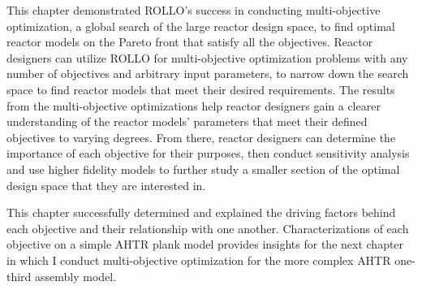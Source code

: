 This chapter demonstrated \gls{ROLLO}'s success in conducting multi-objective 
optimization, a global search of the large reactor design space, to find optimal reactor 
models on the Pareto front that satisfy all the objectives. 
Reactor designers can utilize \gls{ROLLO} for multi-objective optimization problems with 
any number of objectives and arbitrary input parameters, to narrow down the search space 
to find reactor models that meet their desired requirements. 
The results from the multi-objective optimizations help reactor designers gain a clearer 
understanding of the reactor models' parameters that meet their defined objectives to 
varying degrees.
From there, reactor designers can determine the importance of each objective for 
their purposes, then conduct sensitivity analysis and use higher fidelity models to 
further study a smaller section of the optimal design space that they are 
interested in.

This chapter successfully determined and explained the driving factors behind 
each objective and their relationship with one another.  
Characterizations of each objective on a simple \gls{AHTR} plank model provides 
insights for the next chapter in which I conduct multi-objective optimization for 
the more complex \gls{AHTR} one-third assembly model. 
